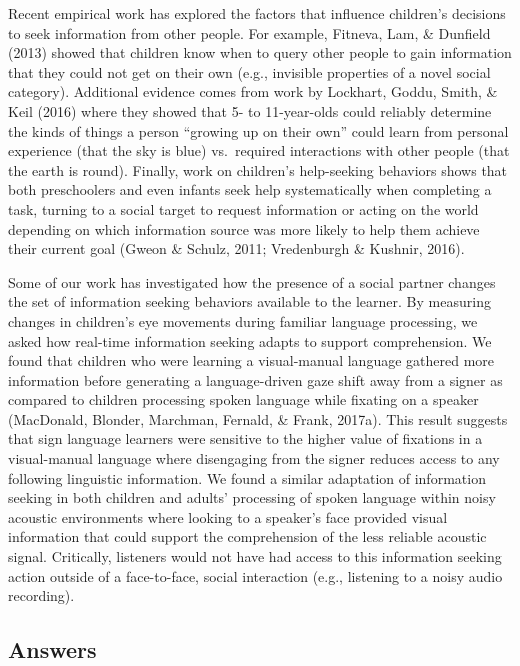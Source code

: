 \documentclass[oneside]{report}
\begin{document}
Recent empirical work has explored the factors that influence children's
decisions to seek information from other people. For example, Fitneva,
Lam, \& Dunfield (2013) showed that children know when to query other
people to gain information that they could not get on their own (e.g.,
invisible properties of a novel social category). Additional evidence
comes from work by Lockhart, Goddu, Smith, \& Keil (2016) where they
showed that 5- to 11-year-olds could reliably determine the kinds of
things a person ``growing up on their own'' could learn from personal
experience (that the sky is blue) vs.~required interactions with other
people (that the earth is round). Finally, work on children's
help-seeking behaviors shows that both preschoolers and even infants
seek help systematically when completing a task, turning to a social
target to request information or acting on the world depending on which
information source was more likely to help them achieve their current
goal (Gweon \& Schulz, 2011; Vredenburgh \& Kushnir, 2016).

Some of our work has investigated how the presence of a social partner
changes the set of information seeking behaviors available to the
learner. By measuring changes in children's eye movements during
familiar language processing, we asked how real-time information seeking
adapts to support comprehension. We found that children who were
learning a visual-manual language gathered more information before
generating a language-driven gaze shift away from a signer as compared
to children processing spoken language while fixating on a speaker
(MacDonald, Blonder, Marchman, Fernald, \& Frank, 2017a). This result
suggests that sign language learners were sensitive to the higher value
of fixations in a visual-manual language where disengaging from the
signer reduces access to any following linguistic information. We found
a similar adaptation of information seeking in both children and adults'
processing of spoken language within noisy acoustic environments where
looking to a speaker's face provided visual information that could
support the comprehension of the less reliable acoustic signal.
Critically, listeners would not have had access to this information
seeking action outside of a face-to-face, social interaction (e.g.,
listening to a noisy audio recording).

\subsection{Answers}\label{answers}
\end{document}
